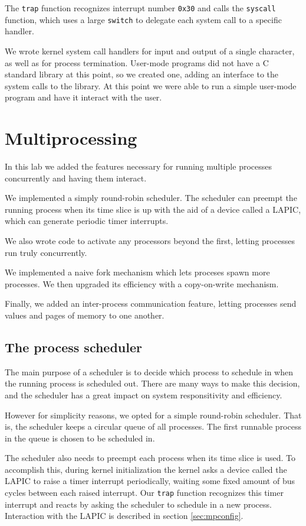 \documentclass{report}
\begin{document}
The \texttt{trap} function recognizes interrupt number \texttt{0x30} and calls the
\texttt{syscall} function, which uses a large \texttt{switch} to delegate each
system call to a specific handler.

We wrote kernel system call handlers for input and output of a single
character, as well as for process termination. User-mode programs did not have
a C standard library at this point, so we created one, adding an interface to
the system calls to the library. At this point we were able to run a simple
user-mode program and have it interact with the user. 



\chapter{Multiprocessing}
In this lab we added the features necessary for running multiple processes
concurrently and having them interact. 

We implemented a simply round-robin scheduler. The scheduler can preempt the
running process when its time slice is up with the aid of a device called a
LAPIC, which can generate periodic timer interrupts.

We also wrote code to activate any processors beyond the first, letting
processes run truly concurrently. 

We implemented a naive fork mechanism which lets proceses spawn more
processes. We then upgraded its efficiency with a copy-on-write mechanism.

Finally, we added an inter-process communication feature, letting processes
send values and pages of memory to one another.



\section{The process scheduler}
\label{sec:preempt}
The main purpose of a scheduler is to decide which process to schedule in when
the running process is scheduled out. There are many ways to make this
decision, and the scheduler has a great impact on system responsitivity and
efficiency. 

However for simplicity reasons, we opted for a simple round-robin scheduler.
That is, the scheduler keeps a circular queue of all processes. The first
runnable process in the queue is chosen to be scheduled in.

The scheduler also needs to preempt each process when its time slice is used.
To accomplish this, during kernel initialization the kernel asks a device
called the LAPIC to raise a timer interrupt periodically, waiting some fixed
amount of bus cycles between each raised interrupt. Our \texttt{trap} function
recognizes this timer interrupt and reacts by asking the scheduler to schedule
in a new process. Interaction with the LAPIC is described in section
\ref{sec:mpconfig}.
\end{document}

